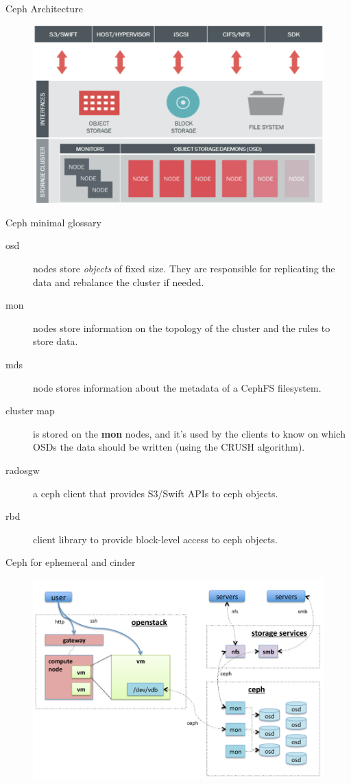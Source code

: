 \documentclass[english,serif,mathserif,usenames,dvipsnames]{beamer}
\begin{document}
\begin{frame}
  {Ceph Architecture}
  \begin{figure}[ht]
    \centering
    \includegraphics[width=\linewidth]{ceph-arch.png}
  \end{figure}
\end{frame}

\begin{frame}
  {Ceph minimal glossary}

  \begin{description}
  \item[osd] nodes store \textit{objects} of fixed size. They
    are responsible for replicating the data and rebalance the cluster
    if needed.
  \item[mon] nodes store information on the topology of the cluster
    and the rules to store data.
  \item[mds] node stores information about the metadata of a CephFS
    filesystem.
  \item[cluster map] is stored on the \textbf{mon} nodes, and it's
    used by the clients to know on which OSDs the data should be
    written (using the CRUSH algorithm).
  \item[radosgw] a ceph client that provides S3/Swift APIs to ceph
    objects.
  \item[rbd] client library to provide block-level access to ceph objects.
  \end{description}
\end{frame}

\begin{frame}
  {Ceph for ephemeral and cinder}
  \begin{figure}[ht]
    \centering
    \includegraphics[width=0.9\linewidth]{ceph-openstack-vm.png}
  \end{figure}
\end{frame}
\end{document}
